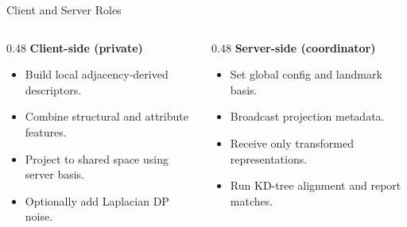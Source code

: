 \documentclass[11pt, aspectratio=169]{beamer}
\begin{document}
\begin{frame}{Client and Server Roles}
    \begin{columns}[T]
        \begin{column}{0.48\textwidth}
            \textbf{Client-side (private)}
            \begin{itemize}
                \item Build local adjacency-derived descriptors.
                \item Combine structural and attribute features.
                \item Project to shared space using server basis.
                \item Optionally add Laplacian DP noise.
            \end{itemize}
        \end{column}
        \begin{column}{0.48\textwidth}
            \textbf{Server-side (coordinator)}
            \begin{itemize}
                \item Set global config and landmark basis.
                \item Broadcast projection metadata.
                \item Receive only transformed representations.
                \item Run KD-tree alignment and report matches.
            \end{itemize}
        \end{column}
    \end{columns}
\end{frame}
\end{document}
